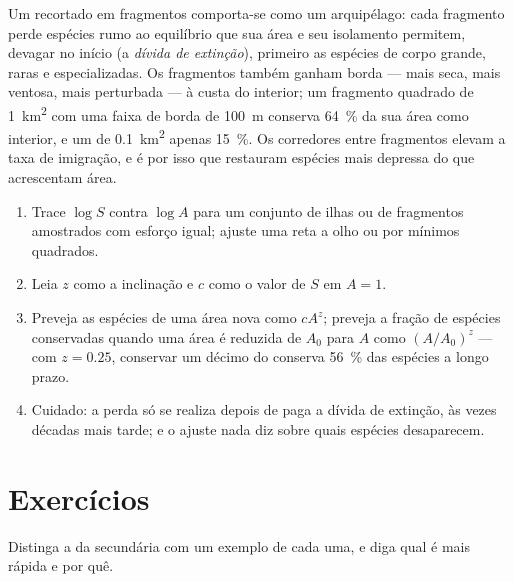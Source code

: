 \begin{proposition}[A fragmentação]\label{prop:b1:ecosystem-dynamics:fragmentation}
Um  recortado em fragmentos comporta-se como um arquipélago:
cada fragmento perde espécies rumo ao equilíbrio que sua área e seu
isolamento permitem, devagar no início (a \emph{dívida de extinção}),
primeiro as espécies de corpo grande, raras e especializadas. Os
fragmentos também ganham borda --- mais seca, mais ventosa, mais
perturbada --- à custa do interior; um fragmento quadrado de
\qty{1}{km^2} com uma faixa de borda de \qty{100}{m} conserva
\qty{64}{\%} da sua área como interior, e um de \qty{0.1}{km^2} apenas
\qty{15}{\%}. Os corredores entre fragmentos elevam a taxa de
imigração, e é por isso que restauram espécies mais depressa do que
acrescentam área.
\end{proposition}

\begin{method}\label{met:b1:ecosystem-dynamics:sar}
\begin{enumerate}
  \item Trace $\log S$ contra $\log A$ para um conjunto de ilhas ou de
        fragmentos amostrados com esforço igual; ajuste uma reta a
        olho ou por mínimos quadrados.
  \item Leia $z$ como a inclinação e $c$ como o valor de $S$ em
        $A = 1$.
  \item Preveja as espécies de uma área nova como $cA^z$; preveja a
        fração de espécies conservadas quando uma área é reduzida de
        $A_0$ para $A$ como $(A/A_0)^z$ --- com $z = 0.25$, conservar um
        décimo do  conserva \qty{56}{\%} das espécies a longo
        prazo.
  \item Cuidado: a perda só se realiza depois de paga a dívida de
        extinção, às vezes décadas mais tarde; e o ajuste nada diz
        sobre quais espécies desaparecem.
\end{enumerate}
\end{method}

\section{Exercícios}

\begin{exercise}[$\star$]\label{exo:b1:ecosystem-dynamics:1}
Distinga a  da secundária com um exemplo de cada uma,
e diga qual é mais rápida e por quê.
\end{exercise}


